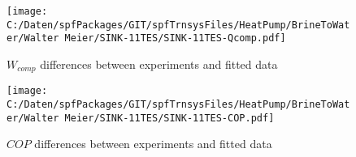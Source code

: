 \documentclass[english]{SPFShortReport}
\begin{document}
\begin{figure}[!ht]
\begin{center}
\texttt{[image: C:/Daten/spfPackages/GIT/spfTrnsysFiles/HeatPump/BrineToWater/Walter Meier/SINK-11TES/SINK-11TES-Qcomp.pdf]}
\caption{$W_{comp}$ differences between experiments and fitted data}
\label{QcompFig}
\end{center}
\end{figure}
\begin{figure}[!ht]
\begin{center}
\texttt{[image: C:/Daten/spfPackages/GIT/spfTrnsysFiles/HeatPump/BrineToWater/Walter Meier/SINK-11TES/SINK-11TES-COP.pdf]}
\caption{$COP$ differences between experiments and fitted data}
\label{COPFig}
\end{center}
\end{figure}
\end{document}
